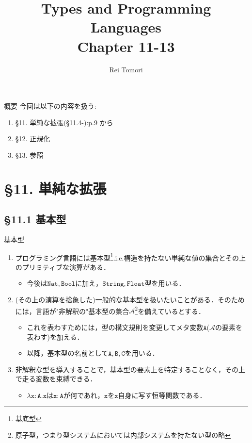 \documentclass[9pt]{beamer}
\title{Types and Programming Languages\\ Chapter 11-13}
\author{Rei Tomori}
\begin{document}
\maketitle
\begin{frame}{概要}
	今回は以下の内容を扱う: \begin{enumerate}
        \item \S 11. 単純な拡張(\S11.4-):p.9 から
        \item \S 12. 正規化
        \item \S 13. 参照
    \end{enumerate}
\end{frame}
\section{\S11. 単純な拡張}
\subsection{\S11.1 基本型}
\begin{frame}{基本型}
    \begin{enumerate}
    \item プログラミング言語には基本型\footnote{基底型}.i.e.構造を持たない単純な値の集合とその上のプリミティブな演算がある．\begin{itemize}
    \item 今後は$\mathtt{Nat, Bool}$に加え，$\mathtt{String, Float}$型を用いる．
    \end{itemize}
    \item (その上の演算を捨象した)一般的な基本型を扱いたいことがある．そのためには，言語が"非解釈の"基本型の集合$\mathscr{A}$\footnote{原子型，つまり型システムにおいては内部システムを持たない型の略}を備えているとする．\begin{itemize}
    \item これを表わすためには，型の構文規則を変更してメタ変数$\mathtt{A}$($\mathscr{A}$の要素を表わす)を加える．
    \item 以降，基本型の名前として$\mathtt{A, B, C}$を用いる．
    \end{itemize}
    \item 非解釈な型を導入することで，基本型の要素上を特定することなく，その上で走る変数を束縛できる．\begin{itemize}
    \item $\mathtt{\lambda x:A. x}$は$\mathtt{x:A}$が何であれ，$\mathtt{x}$を$\mathtt{x}$自身に写す恒等関数である．
    \end{itemize}
    \end{enumerate}
\end{frame}
\end{document}
